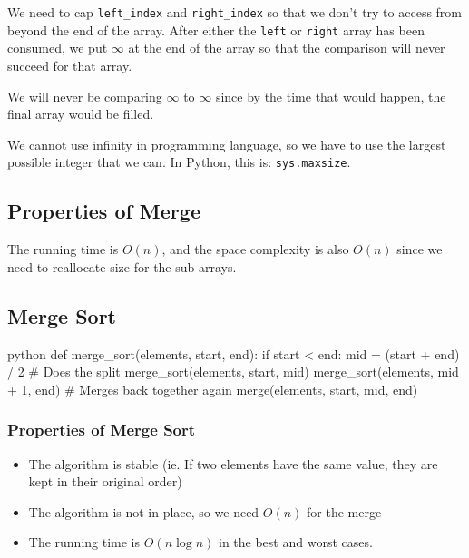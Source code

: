We need to cap \texttt{left_index} and \texttt{right_index} so that we don't try to access from beyond the end of the array.
After either the \texttt{left} or \texttt{right} array has been consumed, we put \(\infty\) at the end of the array so that the comparison will never succeed for that array.
\begin{note}
    We will never be comparing \(\infty\) to \(\infty\) since by the time that would happen, the final array would be filled.
\end{note}
We cannot use infinity in programming language, so we have to use the largest possible integer that we can.
In Python, this is: \texttt{sys.maxsize}. 

\subsection{Properties of Merge}\label{sub:properties_of_merge}

The running time is \(O(n)\), and the space complexity is also \(O(n)\) since we need to reallocate size for the sub arrays.

\subsection{Merge Sort}\label{sub:merge_sort}

\begin{code}{python}
def merge_sort(elements, start, end):
    if start < end:
        mid = (start + end) / 2
        # Does the split
        merge_sort(elements, start, mid)
        merge_sort(elements, mid + 1, end)
        # Merges back together again
        merge(elements, start, mid, end)
\end{code}

\subsubsection{Properties of Merge Sort}\label{ssub:properties_of_merge_sort}

\begin{itemize}
    \item The algorithm is stable (ie. If two elements have the same value, they are kept in their original order)
    \item The algorithm is not in-place, so we need \(O(n)\) for the merge
    \item The running time is \(O(n \log n)\) in the best and worst cases.
\end{itemize}



